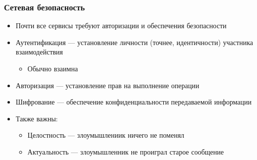 \documentclass[xetex,mathserif,serif]{beamer}
\begin{document}
    \begin{frame}
        \frametitle{Сетевая безопасность}
        \begin{itemize}
            \item Почти все сервисы требуют авторизации и обеспечения безопасности
            \item Аутентификация --- установление личности (точнее, идентичности) участника взаимодействия
            \begin{itemize}
                \item Обычно взаимна
            \end{itemize}
            \item Авторизация --- установление прав на выполнение операции
            \item Шифрование --- обеспечение конфиденциальности передаваемой информации
            \item Также важны:
            \begin{itemize}
                \item Целостность --- злоумышлениик ничего не поменял
                \item Актуальность --- злоумышленник не проиграл старое сообщение
            \end{itemize} 
        \end{itemize}
    \end{frame}
\end{document}
